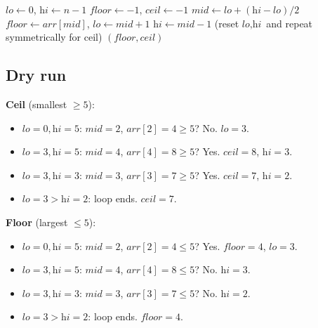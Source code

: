 \begin{algorithm}[H]
\caption{Floor and Ceil}
\begin{algorithmic}[1]
  \State $\textit{lo} \gets 0$, $\textit{hi} \gets n-1$
  \State $\textit{floor} \gets -1$, $\textit{ceil} \gets -1$
    \State $\textit{mid} \gets \textit{lo} + (\textit{hi}-\textit{lo})/2$
      \State $\textit{floor} \gets \textit{arr}[\textit{mid}]$, $\textit{lo} \gets \textit{mid}+1$
    \Else
      \State $\textit{hi} \gets \textit{mid}-1$
    \EndIf
  \EndWhile
  \State (reset $\textit{lo}, \textit{hi}$ and repeat symmetrically for ceil)
  \State \Return $(\textit{floor}, \textit{ceil})$
\EndProcedure
\end{algorithmic}
\end{algorithm}

\subsection*{Dry run}


\textbf{Ceil} (smallest $\ge 5$):
\begin{itemize}
  \item $\textit{lo}=0,\textit{hi}=5$: $\textit{mid}=2$,
        $\textit{arr}[2]=4 \ge 5$? No. $\textit{lo}=3$.
  \item $\textit{lo}=3,\textit{hi}=5$: $\textit{mid}=4$,
        $\textit{arr}[4]=8 \ge 5$? Yes. $\textit{ceil}=8$, $\textit{hi}=3$.
  \item $\textit{lo}=3,\textit{hi}=3$: $\textit{mid}=3$,
        $\textit{arr}[3]=7 \ge 5$? Yes. $\textit{ceil}=7$, $\textit{hi}=2$.
  \item $\textit{lo}=3 > \textit{hi}=2$: loop ends. $\textit{ceil}=7$.
\end{itemize}

\textbf{Floor} (largest $\le 5$):
\begin{itemize}
  \item $\textit{lo}=0,\textit{hi}=5$: $\textit{mid}=2$,
        $\textit{arr}[2]=4 \le 5$? Yes. $\textit{floor}=4$, $\textit{lo}=3$.
  \item $\textit{lo}=3,\textit{hi}=5$: $\textit{mid}=4$,
        $\textit{arr}[4]=8 \le 5$? No. $\textit{hi}=3$.
  \item $\textit{lo}=3,\textit{hi}=3$: $\textit{mid}=3$,
        $\textit{arr}[3]=7 \le 5$? No. $\textit{hi}=2$.
  \item $\textit{lo}=3 > \textit{hi}=2$: loop ends. $\textit{floor}=4$.
\end{itemize}

